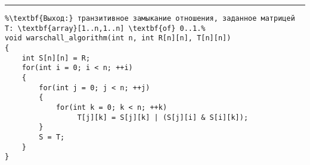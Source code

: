 \vspace{5pt} \hrule
\begin{lstlisting}[caption={Вычисление транзитивного замыкания отношения}, label=p_58, escapechar=\%]
%\noindent\textbf{Вход:} отношение, заданное матрицей R: \textbf{array}[1..n,1..n] \textbf{of} 0..1.\\%
%\textbf{Выход:} транзитивное замыкание отношения, заданное матрицей T: \textbf{array}[1..n,1..n] \textbf{of} 0..1.%
void warschall_algorithm(int n, int R[n][n], T[n][n])
{
	int S[n][n] = R;
	for(int i = 0; i < n; ++i)
	{
		for(int j = 0; j < n; ++j)
		{
			for(int k = 0; k < n; ++k)
				 T[j][k] = S[j][k] | (S[j][i] & S[i][k]);
		}
		S = T;
	}
}
\end{lstlisting}
